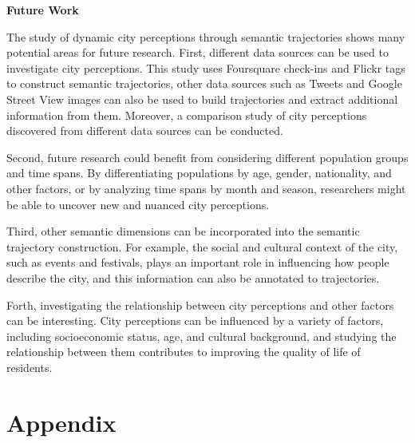 \documentclass{article}
\theoremstyle{remark}
\begin{document}
\textbf{Future Work}

The study of dynamic city perceptions through semantic trajectories shows many potential areas for future research. First, different data sources can be used to investigate city perceptions. This study uses Foursquare check-ins and Flickr tags to construct semantic trajectories, other data sources such as Tweets and Google Street View images can also be used to build trajectories and extract additional information from them. Moreover, a comparison study of city perceptions discovered from different data sources can be conducted.

Second, future research could benefit from considering different population groups and time spans. By differentiating populations by age, gender, nationality, and other factors, or by analyzing time spans by month and season, researchers might be able to uncover new and nuanced city perceptions.

Third, other semantic dimensions can be incorporated into the semantic trajectory construction. For example, the social and cultural context of the city, such as events and festivals, plays an important role in influencing how people describe the city, and this information can also be annotated to trajectories.

Forth, investigating the relationship between city perceptions and other factors can be interesting. City perceptions can be influenced by a variety of factors, including socioeconomic status, age, and cultural background, and studying the relationship between them contributes to improving the quality of life of residents.

\clearpage






\clearpage


\appendix
\section{Appendix} \label{appendix}
\end{document}
